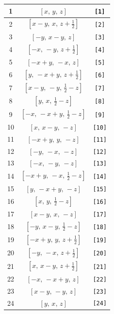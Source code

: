 \documentclass[fleqn,8pt]{jsarticle}
\begin{document}
\begin{longtable}{ccc}
1 & $\left[ x,\, y,\, z \right]$ & {\tt [1]} \\ \hline
2 & $\left[ x - y,\, x,\, z + \frac{1}{2} \right]$ & {\tt [2]} \\ \hline
3 & $\left[ - y,\, x - y,\, z \right]$ & {\tt [3]} \\ \hline
4 & $\left[ - x,\, - y,\, z + \frac{1}{2} \right]$ & {\tt [4]} \\ \hline
5 & $\left[ - x + y,\, - x,\, z \right]$ & {\tt [5]} \\ \hline
6 & $\left[ y,\, - x + y,\, z + \frac{1}{2} \right]$ & {\tt [6]} \\ \hline
7 & $\left[ x - y,\, - y,\, \frac{1}{2} - z \right]$ & {\tt [7]} \\ \hline
8 & $\left[ y,\, x,\, \frac{1}{2} - z \right]$ & {\tt [8]} \\ \hline
9 & $\left[ - x,\, - x + y,\, \frac{1}{2} - z \right]$ & {\tt [9]} \\ \hline
10 & $\left[ x,\, x - y,\, - z \right]$ & {\tt [10]} \\ \hline
11 & $\left[ - x + y,\, y,\, - z \right]$ & {\tt [11]} \\ \hline
12 & $\left[ - y,\, - x,\, - z \right]$ & {\tt [12]} \\ \hline
13 & $\left[ - x,\, - y,\, - z \right]$ & {\tt [13]} \\ \hline
14 & $\left[ - x + y,\, - x,\, \frac{1}{2} - z \right]$ & {\tt [14]} \\ \hline
15 & $\left[ y,\, - x + y,\, - z \right]$ & {\tt [15]} \\ \hline
16 & $\left[ x,\, y,\, \frac{1}{2} - z \right]$ & {\tt [16]} \\ \hline
17 & $\left[ x - y,\, x,\, - z \right]$ & {\tt [17]} \\ \hline
18 & $\left[ - y,\, x - y,\, \frac{1}{2} - z \right]$ & {\tt [18]} \\ \hline
19 & $\left[ - x + y,\, y,\, z + \frac{1}{2} \right]$ & {\tt [19]} \\ \hline
20 & $\left[ - y,\, - x,\, z + \frac{1}{2} \right]$ & {\tt [20]} \\ \hline
21 & $\left[ x,\, x - y,\, z + \frac{1}{2} \right]$ & {\tt [21]} \\ \hline
22 & $\left[ - x,\, - x + y,\, z \right]$ & {\tt [22]} \\ \hline
23 & $\left[ x - y,\, - y,\, z \right]$ & {\tt [23]} \\ \hline
24 & $\left[ y,\, x,\, z \right]$ & {\tt [24]} \\ \hline

\end{longtable}
\end{document}
